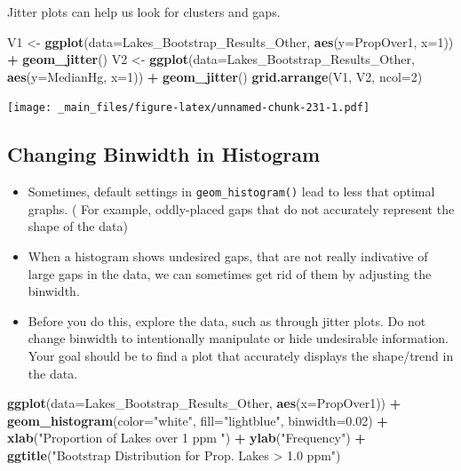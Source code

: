 \documentclass[]{book}
\newenvironment{Shaded}{\begin{snugshade}}{\end{snugshade}}
\newcommand{\KeywordTok}[1]{\textcolor[rgb]{0.13,0.29,0.53}{\textbf{#1}}}
\newcommand{\DataTypeTok}[1]{\textcolor[rgb]{0.13,0.29,0.53}{#1}}
\newcommand{\DecValTok}[1]{\textcolor[rgb]{0.00,0.00,0.81}{#1}}
\newcommand{\FloatTok}[1]{\textcolor[rgb]{0.00,0.00,0.81}{#1}}
\newcommand{\StringTok}[1]{\textcolor[rgb]{0.31,0.60,0.02}{#1}}
\newcommand{\OperatorTok}[1]{\textcolor[rgb]{0.81,0.36,0.00}{\textbf{#1}}}
\newcommand{\NormalTok}[1]{#1}
\begin{document}
Jitter plots can help us look for clusters and gaps.

\begin{Shaded}
\begin{Highlighting}[]
\NormalTok{V1 <-}\StringTok{ }\KeywordTok{ggplot}\NormalTok{(}\DataTypeTok{data=}\NormalTok{Lakes_Bootstrap_Results_Other, }\KeywordTok{aes}\NormalTok{(}\DataTypeTok{y=}\NormalTok{PropOver1, }\DataTypeTok{x=}\DecValTok{1}\NormalTok{)) }\OperatorTok{+}\StringTok{ }\KeywordTok{geom_jitter}\NormalTok{()}
\NormalTok{V2 <-}\StringTok{ }\KeywordTok{ggplot}\NormalTok{(}\DataTypeTok{data=}\NormalTok{Lakes_Bootstrap_Results_Other, }\KeywordTok{aes}\NormalTok{(}\DataTypeTok{y=}\NormalTok{MedianHg, }\DataTypeTok{x=}\DecValTok{1}\NormalTok{)) }\OperatorTok{+}\StringTok{ }\KeywordTok{geom_jitter}\NormalTok{()}
\KeywordTok{grid.arrange}\NormalTok{(V1, V2, }\DataTypeTok{ncol=}\DecValTok{2}\NormalTok{)}
\end{Highlighting}
\end{Shaded}

\texttt{[image: \_main\_files/figure-latex/unnamed-chunk-231-1.pdf]}

\subsection{Changing Binwidth in
Histogram}\label{changing-binwidth-in-histogram}

\begin{itemize}
\item
  Sometimes, default settings in \texttt{geom\_histogram()} lead to less
  that optimal graphs. ( For example, oddly-placed gaps that do not
  accurately represent the shape of the data)
\item
  When a histogram shows undesired gaps, that are not really indivative
  of large gaps in the data, we can sometimes get rid of them by
  adjusting the binwidth.
\item
  Before you do this, explore the data, such as through jitter plots. Do
  not change binwidth to intentionally manipulate or hide undesirable
  information. Your goal should be to find a plot that accurately
  displays the shape/trend in the data.
\end{itemize}

\begin{Shaded}
\begin{Highlighting}[]
\KeywordTok{ggplot}\NormalTok{(}\DataTypeTok{data=}\NormalTok{Lakes_Bootstrap_Results_Other, }\KeywordTok{aes}\NormalTok{(}\DataTypeTok{x=}\NormalTok{PropOver1)) }\OperatorTok{+}\StringTok{  }
\StringTok{  }\KeywordTok{geom_histogram}\NormalTok{(}\DataTypeTok{color=}\StringTok{"white"}\NormalTok{, }\DataTypeTok{fill=}\StringTok{"lightblue"}\NormalTok{, }\DataTypeTok{binwidth=}\FloatTok{0.02}\NormalTok{) }\OperatorTok{+}\StringTok{ }
\StringTok{  }\KeywordTok{xlab}\NormalTok{(}\StringTok{"Proportion of Lakes over 1 ppm "}\NormalTok{) }\OperatorTok{+}\StringTok{ }\KeywordTok{ylab}\NormalTok{(}\StringTok{"Frequency"}\NormalTok{) }\OperatorTok{+}
\StringTok{  }\KeywordTok{ggtitle}\NormalTok{(}\StringTok{"Bootstrap Distribution for Prop. Lakes > 1.0 ppm"}\NormalTok{) }
\end{Highlighting}
\end{Shaded}
\end{document}
